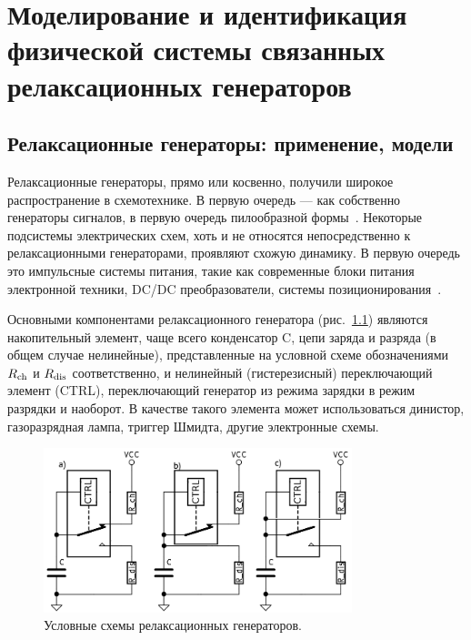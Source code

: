 \chapter{Моделирование и идентификация физической системы связанных релаксационных генераторов}

\newcommand{\RelaxBjtIi}{системы из трёх связанных релаксационных генераторов на паре комплиментарных транзисторов}
\newcommand{\RelaxShIi}{системы из трёх связанных релаксационных генераторов на основе триггеров Шмидта}

\section{Релаксационные генераторы: применение, модели}


Релаксационные генераторы, прямо или косвенно, получили широкое распространение
в схемотехнике. В первую очередь --- как собственно генераторы
сигналов, в первую очередь пилообразной формы~\cite{horowitz,mishenko_du_small_relax}.
Некоторые подсистемы электрических схем, хоть и не относятся непосредственно к
релаксационными генераторами, проявляют схожую динамику.
В первую очередь это импульсные системы питания, такие как
современные блоки питания электронной техники, DC/DC преобразователи,
системы позиционирования~\cite{atu_st104b}.

Основными компонентами релаксационного генератора
(рис.~\ref{atu:f:relax_types})
являются
накопительный элемент, чаще всего конденсатор C,
цепи заряда и разряда (в общем случае нелинейные),
представленные на условной схеме обозначениями
$R_\mathrm{ch}$ и $R_\mathrm{dis}$ соответственно,
и нелинейный (гистерезисный) переключающий элемент (CTRL),
переключающий генератор из режима зарядки в режим разрядки и наоборот.
В качестве такого элемента может использоваться
динистор, газоразрядная лампа, триггер Шмидта,
другие электронные схемы.

\begin{figure}[htb!]
  \centerline{\includegraphics[width=0.8\textwidth]{p/relax_types.png} }
  \caption{Условные схемы релаксационных генераторов.}
  \label{atu:f:relax_types}
\end{figure}

